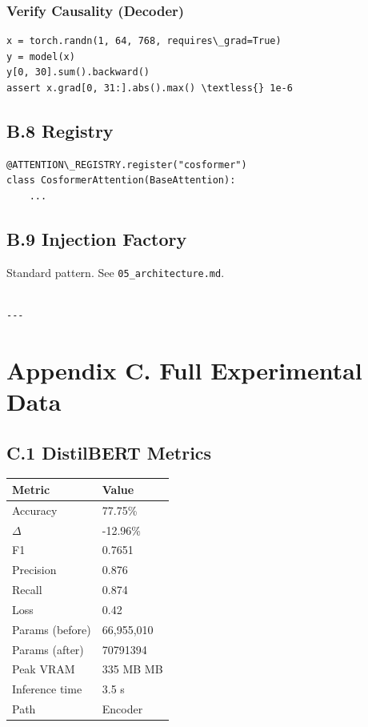 \subsubsection{Verify Causality (Decoder)}

\begin{lstlisting}
x = torch.randn(1, 64, 768, requires\_grad=True)
y = model(x)
y[0, 30].sum().backward()
assert x.grad[0, 31:].abs().max() \textless{} 1e-6
\end{lstlisting}

\subsection{B.8 Registry}

\begin{lstlisting}
@ATTENTION\_REGISTRY.register("cosformer")
class CosformerAttention(BaseAttention):
    ...
\end{lstlisting}

\subsection{B.9 Injection Factory}

Standard pattern. See \texttt{05\_architecture.md}.
\begin{lstlisting}

---
\end{lstlisting}


\section{Appendix C. Full Experimental Data}

\subsection{C.1 DistilBERT Metrics}

\begin{table}[H]
\centering
\small
\begin{tabular}{ll}
\toprule
\textbf{Metric} & \textbf{Value} \\
\midrule
Accuracy & 77.75\% \\
$\Delta$ & -12.96\% \\
F1 & 0.7651 \\
Precision & 0.876 \\
Recall & 0.874 \\
Loss & 0.42 \\
Params (before) & 66,955,010 \\
Params (after) & 70791394 \\
Peak VRAM & 335 MB MB \\
Inference time & 3.5 s \\
Path & Encoder \\
\bottomrule
\end{tabular}
\end{table}


